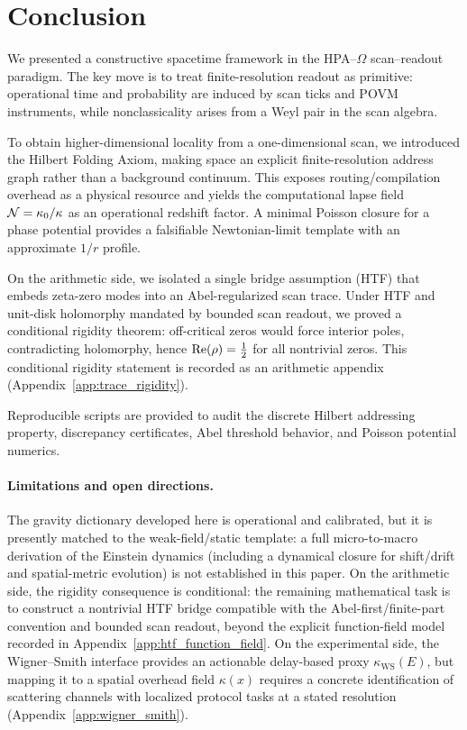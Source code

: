 
\section{Conclusion}
\label{sec:conclusion}

We presented a constructive spacetime framework in the HPA--$\Omega$ scan--readout paradigm.
The key move is to treat finite-resolution readout as primitive: operational time and probability are induced by scan ticks and POVM instruments, while nonclassicality arises from a Weyl pair in the scan algebra.

To obtain higher-dimensional locality from a one-dimensional scan, we introduced the Hilbert Folding Axiom, making space an explicit finite-resolution address graph rather than a background continuum.
This exposes routing/compilation overhead as a physical resource and yields the computational lapse field $\mathcal{N}=\kappa_0/\kappa$ as an operational redshift factor.
A minimal Poisson closure for a phase potential provides a falsifiable Newtonian-limit template with an approximate $1/r$ profile.

On the arithmetic side, we isolated a single bridge assumption (HTF) that embeds zeta-zero modes into an Abel-regularized scan trace.
Under HTF and unit-disk holomorphy mandated by bounded scan readout, we proved a conditional rigidity theorem: off-critical zeros would force interior poles, contradicting holomorphy, hence $\operatorname{Re}(\rho)=\tfrac12$ for all nontrivial zeros.
This conditional rigidity statement is recorded as an arithmetic appendix (Appendix~\ref{app:trace_rigidity}).

Reproducible scripts are provided to audit the discrete Hilbert addressing property, discrepancy certificates, Abel threshold behavior, and Poisson potential numerics.

\paragraph{Limitations and open directions.}
The gravity dictionary developed here is operational and calibrated, but it is presently matched to the weak-field/static template: a full micro-to-macro derivation of the Einstein dynamics (including a dynamical closure for shift/drift and spatial-metric evolution) is not established in this paper.
On the arithmetic side, the rigidity consequence is conditional: the remaining mathematical task is to construct a nontrivial HTF bridge compatible with the Abel-first/finite-part convention and bounded scan readout, beyond the explicit function-field model recorded in Appendix~\ref{app:htf_function_field}.
On the experimental side, the Wigner--Smith interface provides an actionable delay-based proxy $\kappa_{\mathrm{WS}}(E)$, but mapping it to a spatial overhead field $\kappa(x)$ requires a concrete identification of scattering channels with localized protocol tasks at a stated resolution (Appendix~\ref{app:wigner_smith}).


